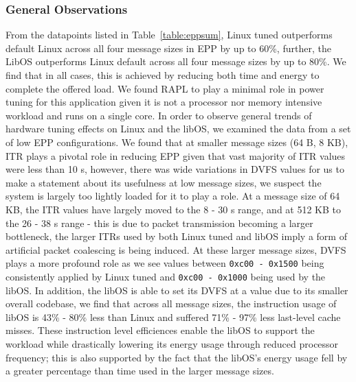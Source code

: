 \subsubsection{General Observations}
From the datapoints listed in Table~\ref{table:eppsum}, Linux tuned outperforms default Linux across all four message sizes in EPP by up to 60\%, further, the LibOS outperforms Linux default across all four message sizes by up to 80\%. We find that in all cases, this is achieved by reducing both time and energy to complete the offered load. We found RAPL to play a minimal role in power tuning for this application given it is not a processor nor memory intensive workload and runs on a single core. In order to observe general trends of hardware tuning effects on Linux and the libOS, we examined the data from a set of low EPP configurations. We found that at smaller message sizes (64 B, 8 KB), ITR plays a pivotal role in reducing EPP given that vast majority of ITR values were less than 10 \micro s, however, there was wide variations in DVFS values for us to make a statement about its usefulness at low message sizes, we suspect the system is largely too lightly loaded for it to play a role. At a message size of 64 KB, the ITR values have largely moved to the 8 - 30 \micro s range, and at 512 KB to the 26 - 38 \micro s range - this is due to packet transmission becoming a larger bottleneck, the larger ITRs used by both Linux tuned and libOS imply a form of artificial packet coalescing is being induced. At these larger message sizes, DVFS plays a more profound role as we see values between \texttt{0xc00 - 0x1500} being consistently applied by Linux tuned and \texttt{0xc00 - 0x1000} being used by the libOS. In addition, the libOS is able to set its DVFS at a value due to its smaller overall codebase, we find that across all message sizes, the instruction usage of libOS is 43\% - 80\% less than Linux and suffered 71\% - 97\% less last-level cache misses. These instruction level efficiences enable the libOS to support the workload while drastically lowering its energy usage through reduced processor frequency; this is also supported by the fact that the libOS's energy usage fell by a greater percentage than time used in the larger message sizes.

